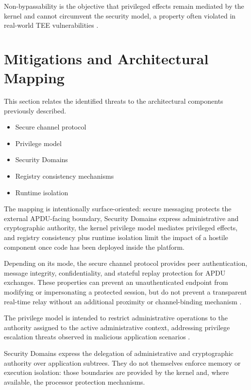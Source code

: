 Non-bypassability is the objective that privileged effects remain mediated by
the kernel and cannot circumvent the security model, a property often violated
in real-world TEE vulnerabilities \cite{cerdeira2022rezone}.

\section{Mitigations and Architectural Mapping}

This section relates the identified threats to the architectural components
previously described.

\begin{itemize}
\item Secure channel protocol
\item Privilege model
\item Security Domains
\item Registry consistency mechanisms
\item Runtime isolation
\end{itemize}

The mapping is intentionally surface-oriented: secure messaging protects the
external APDU-facing boundary, Security Domains express administrative and
cryptographic authority, the kernel privilege model mediates privileged
effects, and registry consistency plus runtime isolation limit the impact of a
hostile component once code has been deployed inside the platform.

Depending on its mode, the secure channel protocol provides peer authentication,
message integrity, confidentiality, and stateful replay protection for APDU
exchanges. These properties can prevent an unauthenticated endpoint from
modifying or impersonating a protected session, but do not prevent a transparent
real-time relay without an additional proximity or channel-binding mechanism
\cite{roland2012relay}.

The privilege model is intended to restrict administrative operations to the
authority assigned to the active administrative context, addressing privilege
escalation threats observed in malicious application scenarios
\cite{mostowski2008malicious}.

Security Domains express the delegation of administrative and cryptographic
authority over application subtrees. They do not themselves enforce memory or
execution isolation: those boundaries are provided by the kernel and, where
available, the processor protection mechanisms.

